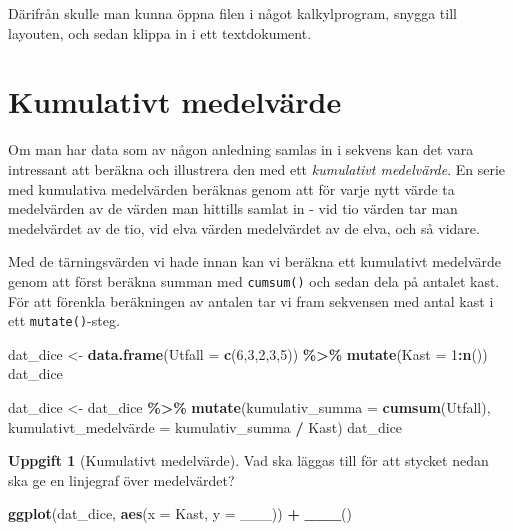 \documentclass[
]{book}
\newenvironment{Shaded}{\begin{snugshade}}{\end{snugshade}}
\newcommand{\AttributeTok}[1]{\textcolor[rgb]{0.13,0.29,0.53}{#1}}
\newcommand{\DecValTok}[1]{\textcolor[rgb]{0.00,0.00,0.81}{#1}}
\newcommand{\FunctionTok}[1]{\textcolor[rgb]{0.13,0.29,0.53}{\textbf{#1}}}
\newcommand{\NormalTok}[1]{#1}
\newcommand{\OtherTok}[1]{\textcolor[rgb]{0.56,0.35,0.01}{#1}}
\newcommand{\SpecialCharTok}[1]{\textcolor[rgb]{0.81,0.36,0.00}{\textbf{#1}}}
\theoremstyle{definition}
\theoremstyle{definition}
\theoremstyle{definition}
\newtheorem{exercise}{Uppgift}[chapter]
\theoremstyle{definition}
\theoremstyle{remark}
\begin{document}
Därifrån skulle man kunna öppna filen i något kalkylprogram, snygga till layouten, och sedan klippa in i ett textdokument.

\section{Kumulativt medelvärde}\label{kumulativt-medelvuxe4rde}

Om man har data som av någon anledning samlas in i sekvens kan det vara intressant att beräkna och illustrera den med ett \emph{kumulativt medelvärde}. En serie med kumulativa medelvärden beräknas genom att för varje nytt värde ta medelvärden av de värden man hittills samlat in - vid tio värden tar man medelvärdet av de tio, vid elva värden medelvärdet av de elva, och så vidare.

Med de tärningsvärden vi hade innan kan vi beräkna ett kumulativt medelvärde genom att först beräkna summan med \texttt{cumsum()} och sedan dela på antalet kast. För att förenkla beräkningen av antalen tar vi fram sekvensen med antal kast i ett \texttt{mutate()}-steg.

\begin{Shaded}
\begin{Highlighting}[]
\NormalTok{dat\_dice }\OtherTok{\textless{}{-}} \FunctionTok{data.frame}\NormalTok{(}\AttributeTok{Utfall =} \FunctionTok{c}\NormalTok{(}\DecValTok{6}\NormalTok{,}\DecValTok{3}\NormalTok{,}\DecValTok{2}\NormalTok{,}\DecValTok{3}\NormalTok{,}\DecValTok{5}\NormalTok{)) }\SpecialCharTok{\%\textgreater{}\%}
  \FunctionTok{mutate}\NormalTok{(}\AttributeTok{Kast =} \DecValTok{1}\SpecialCharTok{:}\FunctionTok{n}\NormalTok{())                           }
\NormalTok{dat\_dice}

\NormalTok{dat\_dice }\OtherTok{\textless{}{-}}\NormalTok{ dat\_dice }\SpecialCharTok{\%\textgreater{}\%}
  \FunctionTok{mutate}\NormalTok{(}\AttributeTok{kumulativ\_summa =} \FunctionTok{cumsum}\NormalTok{(Utfall),  }
\NormalTok{         kumulativt\_medelvärde }\OtherTok{=}\NormalTok{ kumulativ\_summa }\SpecialCharTok{/}\NormalTok{ Kast)}
\NormalTok{dat\_dice}
\end{Highlighting}
\end{Shaded}

\begin{exercise}[Kumulativt medelvärde]

Vad ska läggas till för att stycket nedan ska ge en linjegraf över medelvärdet?

\begin{Shaded}
\begin{Highlighting}[]
\FunctionTok{ggplot}\NormalTok{(dat\_dice, }\FunctionTok{aes}\NormalTok{(}\AttributeTok{x =}\NormalTok{ Kast, }\AttributeTok{y =}\NormalTok{ \_\_\_)) }\SpecialCharTok{+}
  \FunctionTok{\_\_\_}\NormalTok{()}
\end{Highlighting}
\end{Shaded}

\end{exercise}
\end{document}

